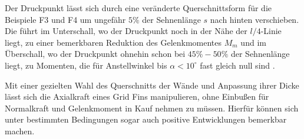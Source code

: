 Der Druckpunkt lässt sich durch eine veränderte Querschnittsform für die Beispiele F3 und F4 um ungefähr $5\%$ der Sehnenlänge $s$ nach hinten verschieben. Die führt im Unterschall, wo der Druckpunkt noch in der Nähe der $l/4$-Linie liegt, zu einer bemerkbaren Reduktion des Gelenkmomentes $M_m$ und im Überschall, wo der Druckpunkt ohnehin schon bei $45\%-50\%$ der Sehnenlänge liegt, zu Momenten, die für Anstellwinkel bis $\alpha<10^\circ$ fast gleich null sind \cite{zellform}.

Mit einer gezielten Wahl des Querschnitts der Wände und Anpassung ihrer Dicke lässt sich die Axialkraft eines Grid Fins manipulieren, ohne Einbußen für Normalkraft und Gelenkmoment in Kauf nehmen zu müssen. Hierfür können sich unter bestimmten Bedingungen sogar auch positive Entwicklungen bemerkbar machen.

